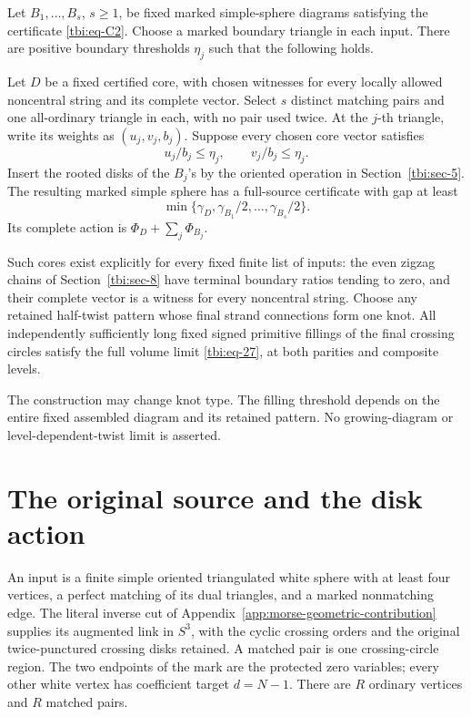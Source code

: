 \begin{theorem}\label{tbi:main} Let \(B_1,\ldots,B_s\), \(s\ge1\), be fixed marked simple-sphere diagrams satisfying the certificate \eqref{tbi:eq-C2}. Choose a marked boundary triangle in each input. There are positive boundary thresholds \(\eta_j\) such that the following holds.

Let \(D\) be a fixed certified core, with chosen witnesses for every locally allowed noncentral string and its complete vector. Select \(s\) distinct matching pairs and one all-ordinary triangle in each, with no pair used twice. At the \(j\)-th triangle, write its weights as \((u_j,v_j,b_j)\). Suppose every chosen core vector satisfies
\begin{equation}\label{tbi:eq-T1}
u_j/b_j\le\eta_j,\qquad v_j/b_j\le\eta_j.
\end{equation}
Insert the rooted disks of the \(B_j\)'s by the oriented operation in Section~\ref{tbi:sec-5}. The resulting marked simple sphere has a full-source certificate with gap at least
\begin{equation}\label{tbi:eq-T2}
\min\{\gamma_D,\gamma_{B_1}/2,\ldots,\gamma_{B_s}/2\}.
\end{equation}
Its complete action is \(\Phi_D+\sum_j\Phi_{B_j}\).

Such cores exist explicitly for every fixed finite list of inputs: the even zigzag chains of Section~\ref{tbi:sec-8} have terminal boundary ratios tending to zero, and their complete vector is a witness for every noncentral string. Choose any retained half-twist pattern whose final strand connections form one knot. All independently sufficiently long fixed signed primitive fillings of the final crossing circles satisfy the full volume limit \eqref{tbi:eq-27}, at both parities and composite levels.

The construction may change knot type. The filling threshold depends on the entire fixed assembled diagram and its retained pattern. No growing-diagram or level-dependent-twist limit is asserted.
\end{theorem}

\section{The original source and the disk action}\label{tbi:sec-1}

An input is a finite simple oriented triangulated white sphere with at least four vertices, a perfect matching of its dual triangles, and a marked nonmatching edge. The literal inverse cut of Appendix~\ref{app:morse-geometric-contribution} supplies its augmented link in \(S^3\), with the cyclic crossing orders and the original twice-punctured crossing disks retained. A matched pair is one crossing-circle region. The two endpoints of the mark are the protected zero variables; every other white vertex has coefficient target \(d=N-1\). There are \(R\) ordinary vertices and \(R\) matched pairs.

